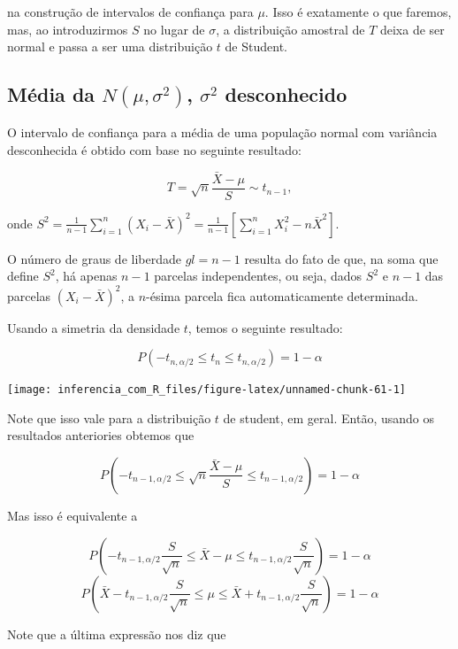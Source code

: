 \documentclass[
]{book}
\begin{document}
na construção de intervalos de confiança para \(\mu\). Isso é exatamente o que faremos, mas, ao introduzirmos \(S\) no lugar de \(\sigma\), a distribuição amostral de \(T\) deixa de ser normal e passa a ser uma distribuição \(t\) de Student.

\hypertarget{muxe9dia-da-nmusigma2-sigma2-desconhecido}{%
\subsection{\texorpdfstring{Média da \(N(\mu,\sigma^2)\), \(\sigma^2\) desconhecido}{Média da N(\textbackslash mu,\textbackslash sigma\^{}2), \textbackslash sigma\^{}2 desconhecido}}\label{muxe9dia-da-nmusigma2-sigma2-desconhecido}}

O intervalo de confiança para a média de uma população normal com variância desconhecida é obtido com base no seguinte resultado:

\[T=\sqrt{n}\frac{\bar X-\mu}{S}\sim t_{n-1},\]

onde \(S^2=\frac{1}{n-1}\sum_{i=1}^{n}(X_i-\bar X)^2=\frac{1}{n-1}\left[\sum_{i=1}^{n}X_i^2-n\bar X^2\right].\)

O número de graus de liberdade \(gl=n-1\) resulta do fato de que, na soma que define \(S^2\), há apenas \(n-1\) parcelas independentes, ou seja, dados \(S^2\) e \(n-1\) das parcelas \((X_i - \bar X)^2\), a \(n\)-ésima parcela fica automaticamente determinada.

Usando a simetria da densidade \(t\), temos o seguinte resultado:

\[P\left(-t_{n,\alpha/2}\leq t_{n} \leq t_{n,\alpha/2}\right)=1-\alpha\]

\begin{center}\texttt{[image: inferencia\_com\_R\_files/figure-latex/unnamed-chunk-61-1]} \end{center}

Note que isso vale para a distribuição \(t\) de student, em geral. Então, usando os resultados anteriories obtemos que

\[P\left(-t_{n-1,\alpha/2}\leq \sqrt{n}\frac{\bar X-\mu}{S} \leq t_{n-1,\alpha/2}\right)=1-\alpha\]

Mas isso é equivalente a

\[P\left(-t_{n-1,\alpha/2}\frac{S}{\sqrt{n}}\leq \bar X-\mu \leq t_{n-1,\alpha/2}\frac{S}{\sqrt{n}}\right)=1-\alpha\]
\[P\left(\bar X-t_{n-1,\alpha/2}\frac{S}{\sqrt{n}}\leq \mu \leq \bar X + t_{n-1,\alpha/2}\frac{S}{\sqrt{n}}\right)=1-\alpha\]

Note que a última expressão nos diz que
\end{document}
